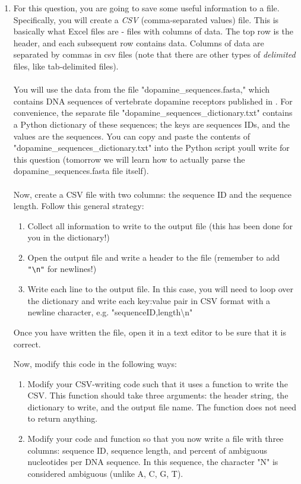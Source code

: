 \documentclass{article}[12pt]
\newcommand{\code}[1]{\texttt{#1}}  %
\begin{document}
\begin{enumerate}[itemsep=5ex]
	\item For this question, you are going to save some useful information to a file. Specifically, you will create a \emph{CSV} (comma-separated values) file. This is basically what Excel files are - files with columns of data. The top row is the header, and each subsequent row contains data. Columns of data are separated by commas in csv files (note that there are other types of \emph{delimited} files, like tab-delimited files). 
	\\\\ You will use the data from the file "dopamine\_sequences.fasta," which contains DNA sequences of vertebrate dopamine receptors published in \citet{SpielmanKumarWilke2015}. For convenience, the separate file "dopamine\_sequences\_dictionary.txt" contains a Python dictionary of these sequences; the keys are sequences IDs, and the values are the sequences. You can copy and paste the contents of "dopamine\_sequences\_dictionary.txt" into the Python script you\textquotesingle ll write for this question (tomorrow we will learn how to actually parse the dopamine\_sequences.fasta file itself).
	\\\\ Now, create a CSV file with two columns: the sequence ID and the sequence length. Follow this general strategy:
		\begin{enumerate}[itemsep=2ex]
			\item Collect all information to write to the output file (this has been done for you in the dictionary!)
			\item Open the output file and write a header to the file (remember to add \code{"\textbackslash n"} for newlines!)
			\item Write each line to the output file. In this case, you will need to loop over the dictionary and write each key:value pair in CSV format with a newline character, e.g. "sequenceID,length\textbackslash n"
		\end{enumerate}
	Once you have written the file, open it in a text editor to be sure that it is correct.
	
	Now, modify this code in the following ways:
		\begin{enumerate}[itemsep=2ex]
	
			\item Modify your CSV-writing code such that it uses a function to write the CSV. This function should take three arguments: the header string, the dictionary to write, and the output file name. The function does not need to return anything.
		
			\item Modify your code and function so that you now write a file with three columns: sequence ID, sequence length, and percent of ambiguous nucleotides per DNA sequence. In this sequence, the character "N" is considered ambiguous (unlike A, C, G, T).
			
		\end{enumerate}
	\end{enumerate}	










\end{document}

